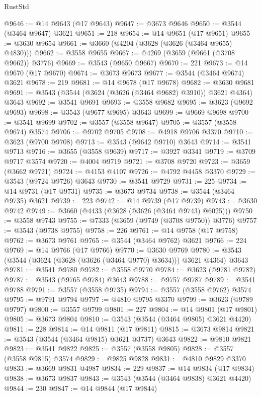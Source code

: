 \begin{lexlean}{RustStd}
\begin{coremodule}
@9646 := @14 @9643 (@17 @9643)
@9647 := @3673 @9646
@9650 := @3544 (@3464 @9647) @3621
@9651 := 218
@9654 := @14 @9651 (@17 @9651)
@9655 := @3630 @9654
@9661 := @3660 (@4204 (@3628 (@3626 (@3464 @9655) @4830)))
@9662 := @3558 @9655
@9667 := @4269 (@3659 (@9661 (@3708 @9662)) @3776)
@9669 := @3543 (@9650 @9667)
@9670 := 221
@9673 := @14 @9670 (@17 @9670)
@9674 := @3673 @9673
@9677 := @3544 (@3464 @9674) @3621
@9678 := 219
@9681 := @14 @9678 (@17 @9678)
@9682 := @3630 @9681
@9691 := @3543 (@3544 (@3624 (@3626 (@3464 @9682) @3910)) @3621 @4364) @3643
@9692 := @3541 @9691
@9693 := @3558 @9682
@9695 := @3623 (@9692 @9693)
@9698 := @3543 (@9677 @9695) @3643
@9699 := @9669 @9698
@9700 := @3541 @9699
@9702 := @3557 (@3558 @9647)
@9705 := @3557 (@3558 @9674) @3574
@9706 := @9702 @9705
@9708 := @4918 @9706 @3370
@9710 := @3623 (@9700 @9708)
@9713 := @3543 (@9642 @9710) @3643
@9714 := @3541 @9713
@9716 := @3655 (@3558 @9639)
@9717 := @3927 @3341
@9719 := @3709 @9717 @3574
@9720 := @4004 @9719
@9721 := @3708 @9720
@9723 := @3659 (@3662 @9721)
@9724 := @4153 @4107
@9726 := @4792 @4458 @3370
@9729 := @3543 (@9724 @9726) @3643
@9730 := @3541 @9729
@9731 := 225
@9734 := @14 @9731 (@17 @9731)
@9735 := @3673 @9734
@9738 := @3544 (@3464 @9735) @3621
@9739 := 223
@9742 := @14 @9739 (@17 @9739)
@9743 := @3630 @9742
@9749 := @3660 (@4433 (@3628 (@3626 (@3464 @9743) @6025)))
@9750 := @3558 @9743
@9755 := @7333 (@3659 (@9749 (@3708 @9750)) @3776)
@9757 := @3543 (@9738 @9755)
@9758 := 226
@9761 := @14 @9758 (@17 @9758)
@9762 := @3673 @9761
@9765 := @3544 (@3464 @9762) @3621
@9766 := 224
@9769 := @14 @9766 (@17 @9766)
@9770 := @3630 @9769
@9780 := @3543 (@3544 (@3624 (@3628 (@3626 (@3464 @9770) @3634))) @3621 @4364) @3643
@9781 := @3541 @9780
@9782 := @3558 @9770
@9784 := @3623 (@9781 @9782)
@9787 := @3543 (@9765 @9784) @3643
@9788 := @9757 @9787
@9789 := @3541 @9788
@9791 := @3557 (@3558 @9735)
@9794 := @3557 (@3558 @9762) @3574
@9795 := @9791 @9794
@9797 := @4810 @9795 @3370
@9799 := @3623 (@9789 @9797)
@9800 := @3557 @9799
@9801 := 227
@9804 := @14 @9801 (@17 @9801)
@9805 := @3673 @9804
@9810 := @3543 (@3544 (@3464 @9805) @3621 @4420)
@9811 := 228
@9814 := @14 @9811 (@17 @9811)
@9815 := @3673 @9814
@9821 := @3543 (@3544 (@3464 @9815) @3621 @3737) @3643
@9822 := @9810 @9821
@9823 := @3541 @9822
@9825 := @3557 (@3558 @9805)
@9828 := @3557 (@3558 @9815) @3574
@9829 := @9825 @9828
@9831 := @4810 @9829 @3370
@9833 := @3669 @9831 @4987
@9834 := 229
@9837 := @14 @9834 (@17 @9834)
@9838 := @3673 @9837
@9843 := @3543 (@3544 (@3464 @9838) @3621 @4420)
@9844 := 230
@9847 := @14 @9844 (@17 @9844)

\end{coremodule}
\end{lexlean}
